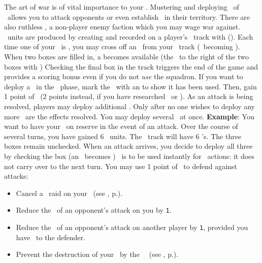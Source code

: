 The art of war is of vital importance to your \planet.  
Mustering and deploying \squadrons\ of \starships\ allows you to attack opponents or even establish \battleships\ in their territory.  
There are also ruthless \pirates, a non-player enemy faction which you may wage war against.
\newline\newline
\military\ units are produced by creating \starships and recorded on a player's \military\ track with (\gainmilitarysymbol).
Each time one of your \starships\ is \activated, you may cross off an \astronaut\ from your \population\ track (\gainastronautsymbol\ becoming \useastronautsymbol).
When two boxes are filled in, a \squadron becomes available (the \emptysquadron\ to the right of the two boxes with \gainmilitarysymbol)
Checking the final box in the track triggers the end of the game and provides a scoring bonus even if you do not \textit{use} the squadron.
\newline\newline
If you want to deploy a \squadron\ in the \deployment\ phase, mark the \emptysquadron\ with an \gainsquadron to show it has been used.
Then, gain 1 point of \power\ (2 points instead, if you have researched \shields\ or \lasers).  
\newline\newline
As an attack is being resolved, players may deploy additional \squadrons.  
Only after no one wishes to deploy any more \squadrons\ are the effects resolved. 
You may deploy several \squadrons\ at once.
\newline\newline
\textbf{Example}: You want to have your \squadrons\ on reserve in the event of an attack.  
Over the course of several turns, you have gained 6 \military\ units.
The \military\ track will have 6 \gainmilitarysymbol's.  
The three \emptysquadron boxes remain unchecked.
When an attack arrives, you decide to deploy all three \squadrons by checking the \squadron box (an \emptysquadron\ becomes \gainsquadron)
\newline\newline
\power\ is to be used instantly for \military\ actions: it does not carry over to the next turn.
\newline\newline
You may use 1 point of \power\ to defend against attacks:
\begin{itemize}
  \item Cancel a \pirate\ raid on your \planet\ (see , p.\pageref{sec:disasters}).
  \item Reduce the \power\ of an opponent's attack on you by \texttt{1}.
  \item Reduce the \power\ of an opponent's attack on another player by \texttt{1}, provided you have \reach\ to the defender.
  \item Prevent the destruction of your \starship\ by the \terrorism\ \disaster\ (see , p.\pageref{sec:disasters}).
\end{itemize}
